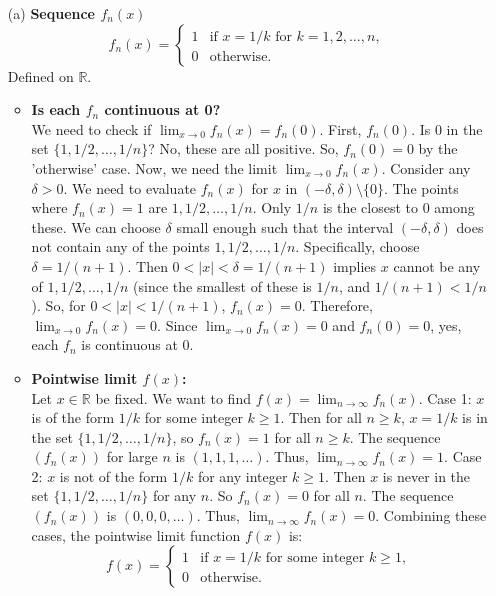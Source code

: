 \documentclass{article}
\newcommand{\R}{\mathbb{R}}
\begin{document}
\begin{enumerate}
  \item[(a)] \textbf{Sequence \(f_n(x)\)}
    \[ f_n(x) = \begin{cases} 1 & \text{if } x=1/k \text{ for } k=1, 2, \ldots, n, \\ 0 & \text{otherwise.} \end{cases} \]
    Defined on \(\R\).

    \begin{itemize}
        \item \textbf{Is each \(f_n\) continuous at 0?} \\
            We need to check if \(\lim_{x\to 0} f_n(x) = f_n(0)\).
            First, \(f_n(0)\). Is \(0\) in the set \(\{1, 1/2, \ldots, 1/n\}\)? No, these are all positive. So, \(f_n(0) = 0\) by the 'otherwise' case.
            Now, we need the limit \(\lim_{x\to 0} f_n(x)\). Consider any \(\delta > 0\). We need to evaluate \(f_n(x)\) for \(x\) in \((-\delta, \delta) \setminus \{0\}\).
            The points where \(f_n(x) = 1\) are \(1, 1/2, \ldots, 1/n\). Only \(1/n\) is the closest to 0 among these.
            We can choose \(\delta\) small enough such that the interval \((-\delta, \delta)\) does not contain any of the points \(1, 1/2, \ldots, 1/n\). Specifically, choose \(\delta = 1/(n+1)\). Then \(0 < |x| < \delta = 1/(n+1)\) implies \(x\) cannot be any of \(1, 1/2, \ldots, 1/n\) (since the smallest of these is \(1/n\), and \(1/(n+1) < 1/n\)).
            So, for \(0 < |x| < 1/(n+1)\), \(f_n(x) = 0\).
            Therefore, \(\lim_{x\to 0} f_n(x) = 0\).
            Since \(\lim_{x\to 0} f_n(x) = 0\) and \(f_n(0) = 0\), yes, each \(f_n\) is continuous at 0.

        \item \textbf{Pointwise limit \(f(x)\):} \\
            Let \(x \in \R\) be fixed. We want to find \(f(x) = \lim_{n\to\infty} f_n(x)\).
            Case 1: \(x\) is of the form \(1/k\) for some integer \(k \ge 1\).
            Then for all \(n \ge k\), \(x = 1/k\) is in the set \(\{1, 1/2, \ldots, 1/n\}\), so \(f_n(x) = 1\) for all \(n \ge k\). The sequence \((f_n(x))\) for large \(n\) is \((1, 1, 1, \ldots)\). Thus, \(\lim_{n\to\infty} f_n(x) = 1\).
            Case 2: \(x\) is not of the form \(1/k\) for any integer \(k \ge 1\).
            Then \(x\) is never in the set \(\{1, 1/2, \ldots, 1/n\}\) for any \(n\). So \(f_n(x) = 0\) for all \(n\). The sequence \((f_n(x))\) is \((0, 0, 0, \ldots)\). Thus, \(\lim_{n\to\infty} f_n(x) = 0\).
            Combining these cases, the pointwise limit function \(f(x)\) is:
            \[ f(x) = \begin{cases} 1 & \text{if } x=1/k \text{ for some integer } k \ge 1, \\ 0 & \text{otherwise.} \end{cases} \]


\end{itemize}
\end{enumerate}
\end{document}

